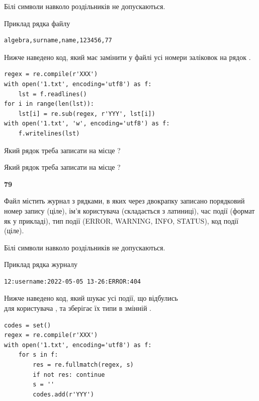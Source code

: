 Білі символи навколо роздільників не допускаються.

Приклад рядка файлу



\begin{verbatim}
algebra,surname,name,123456,77
\end{verbatim}


Нижче наведено код, який має замінити у файлі усі номери заліковок на рядок \code{***}.



\begin{verbatim}
regex = re.compile(r'XXX')
with open('1.txt', encoding='utf8') as f:
    lst = f.readlines()
for i in range(len(lst)):
    lst[i] = re.sub(regex, r'YYY', lst[i])
with open('1.txt', 'w', encoding='utf8') as f:
    f.writelines(lst)
\end{verbatim}







Який рядок треба записати на місце  ?\par
\vspace{5mm}


Який рядок треба записати на місце  ?\par


\newpage

{\begin {center}\textbf{ 79}\end {center}}\par
Файл  містить журнал з рядками, в яких через двокрапку записано поряд\-ко\-вий номер запису (ціле), ім'я користувача (складається з латиниці), час події (фор\-мат як у прикладі), тип події (ERROR, WARNING, INFO, STATUS), код події (ціле).

Білі символи навколо роздільників не допускаються.

Приклад рядка журналу



\begin{verbatim}
12:username:2022-05-05 13-26:ERROR:404
\end{verbatim}


Нижче наведено код, який шукає усі події, що відбулись\\ для користувача , та зберігає їх типи в змінній .



\begin{verbatim}
codes = set()
regex = re.compile(r'XXX')
with open('1.txt', encoding='utf8') as f:
    for s in f:
        res = re.fullmatch(regex, s)
        if not res: continue
        s = ''
        codes.add(r'YYY')
\end{verbatim}





